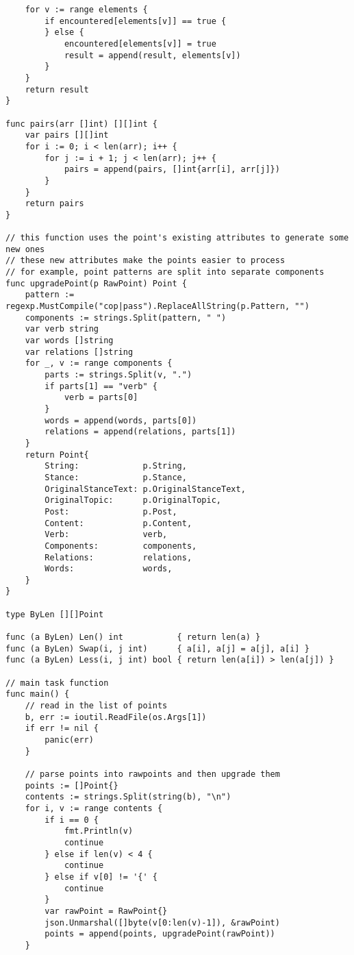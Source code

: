 \documentclass{article}
\begin{document}
\begin{verbatim}
	for v := range elements {
		if encountered[elements[v]] == true {
		} else {
			encountered[elements[v]] = true
			result = append(result, elements[v])
		}
	}
	return result
}

func pairs(arr []int) [][]int {
	var pairs [][]int
	for i := 0; i < len(arr); i++ {
		for j := i + 1; j < len(arr); j++ {
			pairs = append(pairs, []int{arr[i], arr[j]})
		}
	}
	return pairs
}

// this function uses the point's existing attributes to generate some new ones
// these new attributes make the points easier to process
// for example, point patterns are split into separate components
func upgradePoint(p RawPoint) Point {
	pattern := regexp.MustCompile("cop|pass").ReplaceAllString(p.Pattern, "")
	components := strings.Split(pattern, " ")
	var verb string
	var words []string
	var relations []string
	for _, v := range components {
		parts := strings.Split(v, ".")
		if parts[1] == "verb" {
			verb = parts[0]
		}
		words = append(words, parts[0])
		relations = append(relations, parts[1])
	}
	return Point{
		String:             p.String,
		Stance:             p.Stance,
		OriginalStanceText: p.OriginalStanceText,
		OriginalTopic:      p.OriginalTopic,
		Post:               p.Post,
		Content:            p.Content,
		Verb:               verb,
		Components:         components,
		Relations:          relations,
		Words:              words,
	}
}

type ByLen [][]Point

func (a ByLen) Len() int           { return len(a) }
func (a ByLen) Swap(i, j int)      { a[i], a[j] = a[j], a[i] }
func (a ByLen) Less(i, j int) bool { return len(a[i]) > len(a[j]) }

// main task function
func main() {
	// read in the list of points
	b, err := ioutil.ReadFile(os.Args[1])
	if err != nil {
		panic(err)
	}

	// parse points into rawpoints and then upgrade them
	points := []Point{}
	contents := strings.Split(string(b), "\n")
	for i, v := range contents {
		if i == 0 {
			fmt.Println(v)
			continue
		} else if len(v) < 4 {
			continue
		} else if v[0] != '{' {
			continue
		}
		var rawPoint = RawPoint{}
		json.Unmarshal([]byte(v[0:len(v)-1]), &rawPoint)
		points = append(points, upgradePoint(rawPoint))
	}


\end{verbatim}
\end{document}
